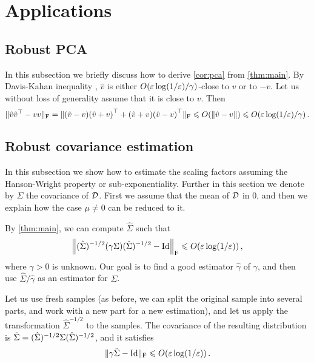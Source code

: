 \section{Applications}

\subsection{Robust PCA}

In this subsection we briefly discuss how to derive \cref{cor:pca} from \cref{thm:main}. By Davis-Kahan inequality \cite{davis-kahan}, $\hat{v}$ is either ${O}(\varepsilon\log(1/\varepsilon)/\gamma)$-close to $v$ or to $-v$. Let us without loss of generality assume that it is close to $v$. Then
\[
\normf{\hat{v}\hat{v}^\top - vv} = \normf{\Paren{\hat{v} - v}\Paren{\hat{v} + v}^\top + \Paren{\hat{v} + v}\Paren{\hat{v} - v}^\top} \le O\Paren{\norm{\hat{v} - v}} \le {O}(\e\log(1/\e)/\gamma)\,.
\]

\subsection{Robust covariance estimation}

In this subsection we show how to estimate the scaling factors assuming the Hanson-Wright property or sub-exponentiality. Further in this section we denote by $\Sigma$ the covariance of $\mathcal D$. First we assume that the mean of $\mathcal D$ in $0$, and then we explain how the case $\mu\neq 0$ can be reduced to it.

By \cref{thm:main}, we can compute $\hat{\Sigma}$ such that
\[
\Normf{\paren{\hat{\Sigma}}^{-1/2}\Paren{\gamma\Sigma}\paren{\hat{\Sigma}}^{-1/2} - \Id} \le O\Paren{\e\log(1/\e)}\,,
\]
where $\gamma > 0$ is unknown. Our goal is to find a good estimator $\hat{\gamma}$ of $\gamma$, and then use $\hat{\Sigma}/\hat{\gamma}$ as an estimator for $\Sigma$.

Let us use fresh samples (as before, we can split the original sample into several parts, and work with a new part for a new estimation), and let us apply the transformation $\hat{\Sigma}^{-1/2}$ to the samples. The covariance of the resulting distribution is $\tilde{\Sigma} = (\hat{\Sigma})^{-1/2}\Sigma (\hat{\Sigma})^{-1/2}$, and it satisfies
\[
\normf{\gamma\tilde{\Sigma} - \Id} \le O\Paren{\e\log(1/\e)}\,.
\]

